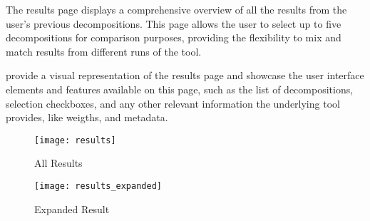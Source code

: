 The results page displays a comprehensive overview of all the results from the
user's previous decompositions. This page allows the user to select up to five
decompositions for comparison purposes, providing the flexibility to mix and
match results from different runs of the tool.

 provide a visual representation of the
results page and showcase the user interface elements and features available on
this page, such as the list of decompositions, selection checkboxes, and any
other relevant information the underlying tool provides, like weigths, and
metadata.

\begin{figure*}[!htb]
  \centering
  \texttt{[image: results]}
  \caption{All Results}
  \label{fig:results}
\end{figure*}
\begin{figure*}[!htb]
  \centering
  \texttt{[image: results\_expanded]}
  \caption{Expanded Result}
  \label{fig:expanded_result}
\end{figure*}
